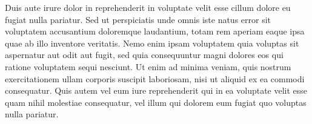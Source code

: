 Duis aute irure dolor in reprehenderit in voluptate velit esse cillum dolore eu fugiat nulla pariatur. Sed ut perspiciatis unde omnis iste natus error sit voluptatem accusantium doloremque laudantium, totam rem aperiam eaque ipsa quae ab illo inventore veritatis. Nemo enim ipsam voluptatem quia voluptas sit aspernatur aut odit aut fugit, sed quia consequuntur magni dolores eos qui ratione voluptatem sequi nesciunt. Ut enim ad minima veniam, quis nostrum exercitationem ullam corporis suscipit laboriosam, nisi ut aliquid ex ea commodi consequatur. Quis autem vel eum iure reprehenderit qui in ea voluptate velit esse quam nihil molestiae consequatur, vel illum qui dolorem eum fugiat quo voluptas nulla pariatur.
